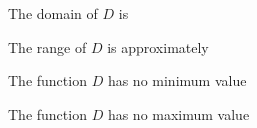 \documentclass{ximera}
\begin{document}
\begin{example}
\begin{question} 


The domain of $D$ is

\begin{multipleChoice}
  \choice {$[-8,3) \cup (3,8]$}
  \choice [correct]{$[-8,8]$}
\end{multipleChoice}
\end{question}





\begin{question} 


The range of $D$ is approximately

\begin{multipleChoice}
  \choice {$[0.97, 8]$}
  \choice {$(-2.43, 8]$}
  \choice [correct]{$(-2.43, 6.38] \cup \{ 8 \}$}
\end{multipleChoice}
\end{question}



\begin{question} 


The function $D$ has no minimum value
\begin{multipleChoice}
\end{multipleChoice}
\end{question}


\begin{question} 
 

The function $D$ has no maximum value
\begin{multipleChoice}
\end{multipleChoice}
\end{question}




\end{example}
\end{document}
